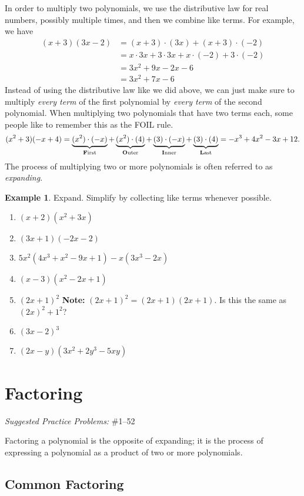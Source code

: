\documentclass[letterpaper,12pt,oneside]{book}
\theoremstyle{definition}
\newtheorem{example}[theorem]{Example}
\newcommand{\practicesection}[2]{%
    \section{#1}
    \textit{Suggested Practice Problems:} #2
    \smallskip%
}
\begin{document}
In order to multiply two polynomials, we use the distributive law for real numbers, possibly multiple times, and then we combine like terms.   For example, we have
\begin{align*}
(x+3)(3x-2)&=(x+3)\cdot (3x)+(x+3)\cdot (-2)\\
&=x\cdot 3x+3\cdot 3x+x\cdot (-2)+3\cdot (-2)\\
&=3x^2+9x-2x-6\\
&=3x^2+7x-6
\end{align*}
Instead of using the distributive law like we did above, we can just make sure to multiply \emph{every term} of the first polynomial by \emph{every term} of the second polynomial.  When multiplying two polynomials that have two terms each, some people like to remember this as the FOIL rule.
\[
(x^2+3)(-x+4)=\underbrace{(x^2)\cdot (-x)}_{\text{\textbf{F}irst}}+\underbrace{(x^2)\cdot (4)}_{\text{\textbf{O}uter}}+\underbrace{(3)\cdot (-x)}_{\text{\textbf{I}nner}}+\underbrace{(3)\cdot (4)}_{\text{\textbf{L}ast}}=-x^3+4x^2-3x+12.
\]
The process of multiplying two or more polynomials is often referred to as \emph{expanding}.

\begin{example}
Expand.  Simplify by collecting like terms whenever possible.
\begin{enumerate}
\item $(x+2)(x^2+3x)$
\vfill
\item $(3x+1)(-2x-2)$
\vfill
\newpage

\item $5x^2(4x^3+x^2-9x+1)-x(3x^3-2x)$
\vfill
\item $(x-3)(x^2-2x+1)$
\vfill
\item $(2x+1)^2$ \hspace{2cm}
\textbf{Note:} $(2x+1)^2=(2x+1)(2x+1)$.  Is this the same as $(2x)^2+1^2$?
\vfill
\item $(3x-2)^3$
\vfill
\item $(2x-y)(3x^2+2y^3-5xy)$
\vfill
\end{enumerate}
\end{example}

\newpage

\practicesection{Factoring}{\#1--52}

\noindent
Factoring a polynomial is the opposite of expanding; it is the process of expressing a polynomial as a product of two or more polynomials.  

\subsection*{Common Factoring}
\end{document}

